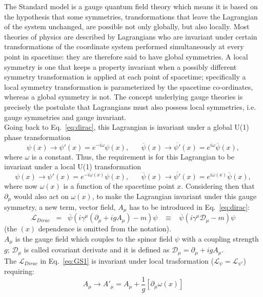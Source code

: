 The Standard model is a gauge quantum field theory which means it is based on the hypothesis that some symmetries, \ie transformations that leave the Lagrangian of the system unchanged, are possible not only globally, but also locally.
Most theories of physics are described by Lagrangians who are invariant under certain transformations of the coordinate system performed simultaneously at every point in spacetime: they are therefore said to have global symmetries. A local symmetry is one that keeps a property invariant when a possibly different symmetry transformation is applied at each point of spacetime; specifically a local symmetry transformation is parameterized by the spacetime co-ordinates, whereas a global symmetry is not. The concept underlying gauge theories is precisely the postulate that Lagrangians must also possess local symmetries, i.e. gauge symmetries and gauge invariant.\\
Going back to Eq.~\ref{eq:dirac}, this Lagrangian is invariant under a global U(1) phase transformation
\begin{equation}
\label{eq:globalT}
 \psi(x) \rightarrow \psi'(x) = e^{-i\omega} \psi(x), \; \; \; \; \; \;    \overline{\psi}(x) \rightarrow \overline{\psi'}(x) = e^{i\omega} \overline{\psi}(x),
\end{equation}
where $\omega$ is a constant. Thus, the requirement is for this Lagrangian to be invariant under a local U(1) transformation
\begin{equation}
\label{eq:localT}
 \psi(x) \rightarrow \psi'(x) = e^{-i\omega(x)} \psi(x), \; \; \; \; \; \;    \overline{\psi}(x) \rightarrow \overline{\psi'}(x) = e^{i\omega(x)} \overline{\psi}(x),
\end{equation}
where now $\omega(x)$ is a function of the spacetime point $x$. Considering then that $\partial_{\mu}$ would also act on $\omega(x)$, to make the 
Lagrangian invariant under this gauge symmetry, a new term, vector field, $A_{\mu}$ has to be introduced in Eq.~\ref{eq:dirac}:
\begin{equation}
\label{eq:GS1}
 \mathcal{L}_{Dirac} \;\; = \;\; \overline{\psi} (i\gamma^{\mu} (\partial_{\mu} + igA_{\mu})-m) \psi \;\;\; \equiv  \;\;\; \overline{\psi} (i\gamma^{\mu}\mathcal{D}_{\mu}-m) \psi 
\end{equation}
(the $(x)$ dependence is omitted from the notation).\\
 $A_{\mu}$ is the gauge field which couples to the spinor field $\psi$ with a coupling strength $g$; $\mathcal{D}_{\mu}$ is called covariant derivate and it is defined as $\mathcal{D}_{\mu} = \partial_{\mu} + igA_{\mu}$. \\
The $\mathcal{L}_{Dirac}$ in Eq.~\ref{eq:GS1} is invariant under local trasformation ($\mathcal{L}_{\psi} =\mathcal{L}_{\psi'}$) requiring:
\begin{equation}
\label{eq:GS2}
A_{\mu} \rightarrow A'_{\mu} =  A_{\mu} + \frac{1}{g}[\partial_{\mu} \omega(x)]
\end{equation}

